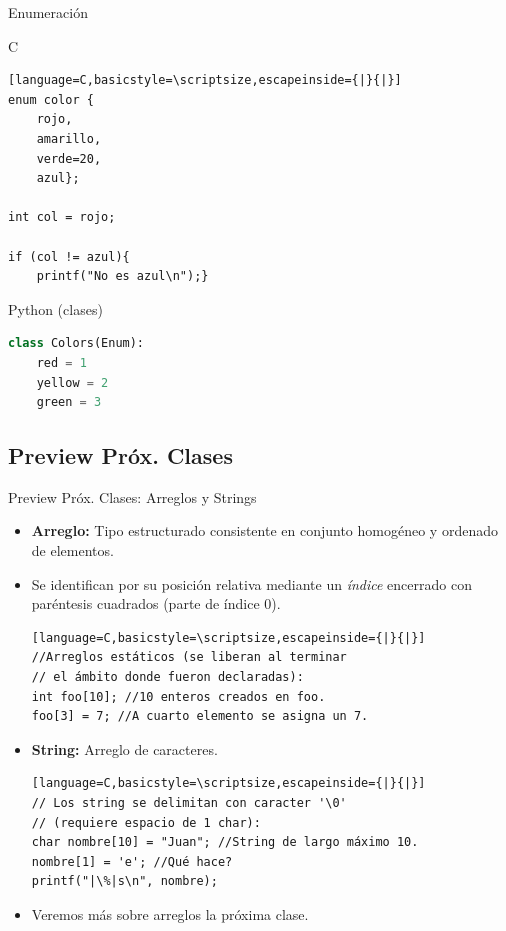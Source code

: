 \documentclass{beamer}
\begin{document}
\begin{frame}[fragile]{Enumeración}
\small
	\begin{exampleblock}{C} 
	\begin{lstlisting}[language=C,basicstyle=\scriptsize,escapeinside={|}{|}]
enum color {
	rojo, 
	amarillo, 
	verde=20, 
	azul};

int col = rojo;

if (col != azul){ 
	printf("No es azul\n");}
	\end{lstlisting}\end{exampleblock}
 \begin{block}{Python (clases)}
	\begin{lstlisting}[language=Python,basicstyle=\scriptsize]
class Colors(Enum):
	red = 1
	yellow = 2
	green = 3
	\end{lstlisting}\end{block}
\end{frame}

\subsection{Preview Próx. Clases}
\begin{frame}[fragile]{Preview Próx. Clases: Arreglos y Strings}
\small
\begin{itemize}
	\item \textbf{Arreglo:} Tipo estructurado consistente en conjunto homogéneo y ordenado de elementos.
	\item Se identifican por su posición relativa mediante un \emph{índice} encerrado con paréntesis cuadrados (parte de índice 0).
	\begin{lstlisting}[language=C,basicstyle=\scriptsize,escapeinside={|}{|}]
//Arreglos estáticos (se liberan al terminar 
// el ámbito donde fueron declaradas):
int foo[10]; //10 enteros creados en foo.
foo[3] = 7; //A cuarto elemento se asigna un 7.
	\end{lstlisting}
	
	\item \textbf{String:} Arreglo de caracteres.
	\begin{lstlisting}[language=C,basicstyle=\scriptsize,escapeinside={|}{|}]
// Los string se delimitan con caracter '\0' 
// (requiere espacio de 1 char):
char nombre[10] = "Juan"; //String de largo máximo 10. 
nombre[1] = 'e'; //Qué hace? 
printf("|\%|s\n", nombre);
	\end{lstlisting}

	\item Veremos más sobre arreglos la próxima clase. 	
\end{itemize}
\end{frame}
\end{document}

